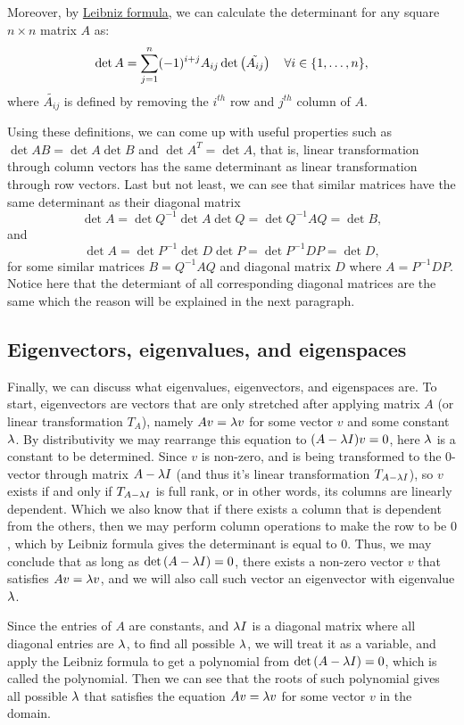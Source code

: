 \documentclass[11pt, cyan, night, 1in]{LatexTemplate/hw}
\begin{document}
Moreover, by \hyperlink{https://en.wikipedia.org/wiki/Determinant}{Leibniz formula}, we can calculate the determinant for any square $n\times n$ matrix $A$ as: \[\det A = \sum_{j=1}^n (-1)^{i+j} A_{ij} \det\left(\tilde{A_{ij}}\right)\quad \forall i\in\{1,\dots,n\},\] where $\tilde{A_{ij}}$ is defined by removing the $i^{th}$ row and $j^{th}$ column of $A$.

Using these definitions, we can come up with useful properties such as $\det AB = \det A \det B$ and $\det A^T = \det A$, that is, linear transformation through column vectors has the same determinant as linear transformation through row vectors. Last but not least, we can see that similar matrices have the same determinant as their diagonal matrix $$\det A = \det Q^{-1} \det A \det Q = \det Q^{-1} A Q = \det B,$$ and $$\det A=\det P^{-1}\det D\det P=\det P^{-1}DP=\det D,$$ for some similar matrices $B=Q^{-1} A Q$ and diagonal matrix $D$ where $A = P^{-1} D P$. Notice here that the determiant of all corresponding diagonal matrices are the same which the reason will be explained in the next paragraph.

\subsection{Eigenvectors, eigenvalues, and eigenspaces}

Finally, we can discuss what eigenvalues, eigenvectors, and eigenspaces are. To start, eigenvectors are vectors that are only stretched after applying matrix $A$ (or linear transformation $T_A$), namely $Av=\lambda v$ for some vector $v$ and some constant $\lambda$. By distributivity we may rearrange this equation to $(A-\lambda I)v=0$, here $\lambda$ is a constant to be determined. Since $v$ is non-zero, and is being transformed to the 0-vector through matrix $A-\lambda I$ (and thus it's linear transformation $T_{A-\lambda I}$), so $v$ exists if and only if $T_{A-\lambda I}$ is  full rank, or in other words, its columns are linearly dependent. Which we also know that if there exists a column that is dependent from the others, then we may perform column operations to make the row to be $0$, which by Leibniz formula gives the determinant is equal to 0. Thus, we may conclude that as long as $\det \left(A - \lambda I\right) = 0$, there exists a non-zero vector $v$ that satisfies $Av=\lambda v$, and we will also call such vector an eigenvector with eigenvalue $\lambda$.

Since the entries of $A$ are constants, and $\lambda I$ is a diagonal matrix where all diagonal entries are $\lambda$, to find all possible $\lambda$, we will treat it as a variable, and apply the Leibniz formula to get a polynomial from $\det\left(A - \lambda I\right) = 0$, which is called the  polynomial. Then we can see that the roots of such polynomial gives all possible $\lambda$ that satisfies the equation $Av=\lambda v$ for some vector $v$ in the domain. 
\end{document}

